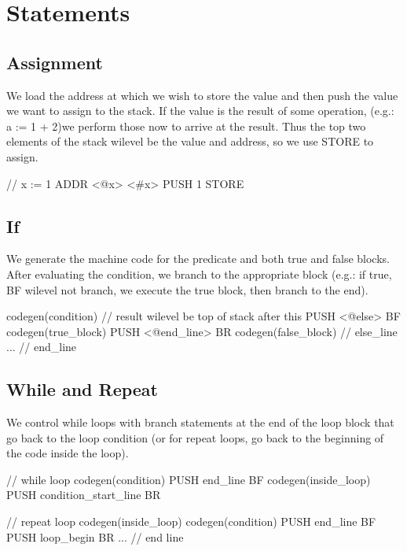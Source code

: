 \section{Statements}
\subsection{Assignment}

We load the address at which we wish to store the value and then push the value
we want to assign to the stack. If the value is the result of some operation, 
(e.g.: a := 1 + 2)we perform those now to arrive at the result. Thus the top two 
elements of the stack wilevel be the value and address, so we use STORE to assign.

\begin{code}[Assignment]
// x := 1
ADDR <@x> <#x>
PUSH 1
STORE
\end{code}

\subsection{If}

We generate the machine code for the predicate and both true and false blocks.
After evaluating the condition, we branch to the appropriate block (e.g.: if true,
BF wilevel not branch, we execute the true block, then branch to the end).

\begin{code}[IfStatement]
codegen(condition)      // result wilevel be top of stack after this
PUSH <@else>
BF   
codegen(true_block)             
PUSH <@end_line> 
BR           
codegen(false_block)    // else_line
...                     // end_line
\end{code}

\subsection{While and Repeat}

We control while loops with branch statements at the end of the loop block that go
back to the loop condition (or for repeat loops, go back to the beginning of the
code inside the loop).

\begin{code}[Loops]
// while loop
codegen(condition)
PUSH end_line
BF 
codegen(inside_loop)
PUSH condition_start_line
BR 

// repeat loop
codegen(inside_loop)
codegen(condition)
PUSH end_line
BF
PUSH loop_begin
BR
...                 // end line
\end{code}

